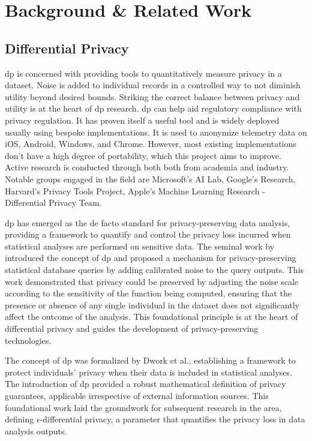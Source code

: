 \chapter{Background \& Related Work\label{chap:background}}

\section{Differential Privacy}

\acrfull{dp} is concerned with providing tools to quantitatively measure privacy in a dataset. Noise is added to individual records in a controlled way to not diminish utility beyond desired bounds.\cite{WhatisDifferentialPrivacy} Striking the correct balance between privacy and utility is at the heart of \acrshort{dp} research.\cite{Dwork2014} \acrshort{dp} can help aid regulatory compliance with privacy regulation. It has proven itself a useful tool and is widely deployed usually using bespoke implementations. It is used to anonymize telemetry data on iOS, Android, Windows, and Chrome.\cite{Maranon,markdefalco_2020} However, most existing implementations don't have a high degree of portability, which this project aims to improve. Active research is conducted through both both from academia and industry. Notable groups engaged in the field are Microsoft's AI Lab, Google's Research, Harvard's Privacy Tools Project, Apple's Machine Learning Research - Differential Privacy Team. 

\acrlong{dp} has emerged as the de facto standard for privacy-preserving data analysis, providing a framework to quantify and control the privacy loss incurred when statistical analyses are performed on sensitive data. The seminal work by \citep{Dwork2006calibrating} introduced the concept of \acrshort{dp} and proposed a mechanism for privacy-preserving statistical database queries by adding calibrated noise to the query outputs. This work demonstrated that privacy could be preserved by adjusting the noise scale according to the sensitivity of the function being computed, ensuring that the presence or absence of any single individual in the dataset does not significantly affect the outcome of the analysis. This foundational principle is at the heart of differential privacy and guides the development of privacy-preserving technologies.

The concept of \acrlong{dp} was formalized by Dwork et al., establishing a framework to protect individuals' privacy when their data is included in statistical analyses. The introduction of \acrshort{dp} provided a robust mathematical definition of privacy guarantees, applicable irrespective of external information sources\cite{Dwork2006calibrating}. This foundational work laid the groundwork for subsequent research in the area, defining $\epsilon$-differential privacy, a parameter that quantifies the privacy loss in data analysis outputs.

